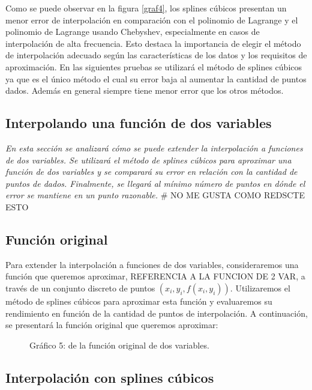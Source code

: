 \documentclass[12pt,a4]{article} %
\begin{document}
\begin{multicols}{2}
Como se puede observar en la figura \ref{graf4}, los splines cúbicos presentan un menor error de interpolación en comparación con el polinomio de Lagrange y el polinomio de Lagrange usando Chebyshev, especialmente en casos de interpolación de alta frecuencia. Esto destaca la importancia de elegir el método de interpolación adecuado según las características de los datos y los requisitos de aproximación. En las siguientes pruebas se utilizará el método de splines cúbicos ya que es el único método el cual su error baja al aumentar la cantidad de puntos dados. Además en general siempre tiene menor error que los otros métodos.

\subsection{Interpolando una función de dos variables}

\textit{En esta sección se analizará cómo se puede extender la interpolación a funciones de dos variables. Se utilizará el método de splines cúbicos para aproximar una función de dos variables y se comparará su error en relación con la cantidad de puntos de dados. Finalmente, se llegará al mínimo número de puntos en dónde el error se mantiene en un punto razonable.} # NO ME GUSTA COMO REDSCTE ESTO

\subsection{Función original}

Para extender la interpolación a funciones de dos variables, consideraremos una función que queremos aproximar, REFERENCIA A LA FUNCION DE 2 VAR, a través de un conjunto discreto de puntos $(x_i, y_i, f(x_i, y_i))$. Utilizaremos el método de splines cúbicos para aproximar esta función y evaluaremos su rendimiento en función de la cantidad de puntos de interpolación. A continuación, se presentará la función original que queremos aproximar:

\begin{figure}
    \centering
    \caption{Gráfico 5: de la función original de dos variables.}
    \label{graf5}
\end{figure}

\subsection{Interpolación con splines cúbicos}


\end{multicols}
\end{document}
